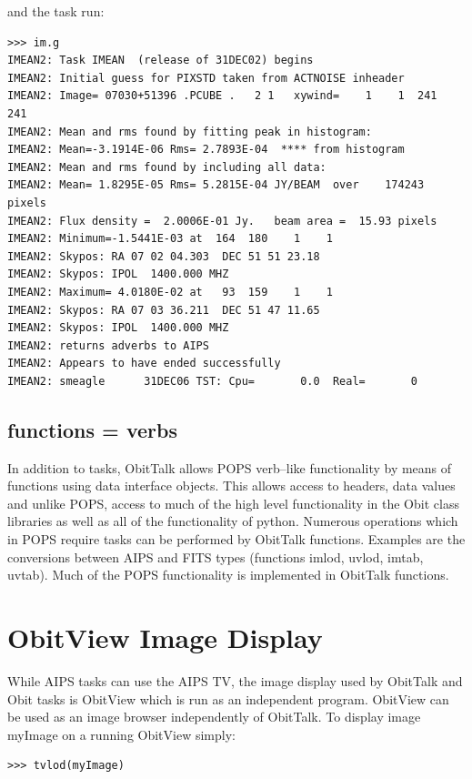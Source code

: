 \documentclass[11pt]{report}
\begin{document}
and the task run:
\begin{verbatim}
>>> im.g
IMEAN2: Task IMEAN  (release of 31DEC02) begins
IMEAN2: Initial guess for PIXSTD taken from ACTNOISE inheader
IMEAN2: Image= 07030+51396 .PCUBE .   2 1   xywind=    1    1  241  241
IMEAN2: Mean and rms found by fitting peak in histogram:
IMEAN2: Mean=-3.1914E-06 Rms= 2.7893E-04  **** from histogram
IMEAN2: Mean and rms found by including all data:
IMEAN2: Mean= 1.8295E-05 Rms= 5.2815E-04 JY/BEAM  over    174243 pixels
IMEAN2: Flux density =  2.0006E-01 Jy.   beam area =  15.93 pixels
IMEAN2: Minimum=-1.5441E-03 at  164  180    1    1
IMEAN2: Skypos: RA 07 02 04.303  DEC 51 51 23.18
IMEAN2: Skypos: IPOL  1400.000 MHZ
IMEAN2: Maximum= 4.0180E-02 at   93  159    1    1
IMEAN2: Skypos: RA 07 03 36.211  DEC 51 47 11.65
IMEAN2: Skypos: IPOL  1400.000 MHZ
IMEAN2: returns adverbs to AIPS
IMEAN2: Appears to have ended successfully
IMEAN2: smeagle      31DEC06 TST: Cpu=       0.0  Real=       0
\end{verbatim}

\subsection{functions = verbs}
In addition to tasks, ObitTalk allows POPS verb--like functionality by
means of functions using data interface objects.
This allows access to headers, data values and unlike POPS, access to
much of the high level functionality in the Obit class libraries as
well as all of the functionality of python.
Numerous operations which in POPS require tasks can be performed by
ObitTalk functions.  
Examples are the conversions between AIPS and FITS types (functions
imlod, uvlod, imtab, uvtab).
Much of the POPS functionality is implemented in ObitTalk functions.

\section{ObitView Image Display \label{ObitView}}
While AIPS tasks can use the AIPS TV, the image display used by
ObitTalk and Obit tasks is ObitView which is run as an independent
program. 
ObitView can be used as an image browser independently of ObitTalk.
To display image myImage on a running ObitView simply:
\begin{verbatim}
>>> tvlod(myImage)
\end{verbatim}
\end{document}
